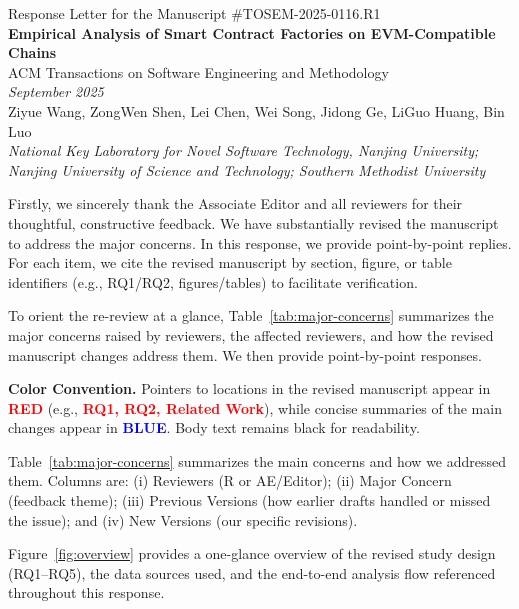 \documentclass[acmsmall]{acmart}
\begin{document}
	\pagestyle{plain}
	\begin{center}
		\Large Response Letter for the Manuscript \#TOSEM-2025-0116.R1 \\[1.5em] \LARGE\textbf{Empirical
		Analysis of Smart Contract Factories on EVM-Compatible Chains} \\[1.5em] \large ACM Transactions
		on Software Engineering and Methodology \\[1em] \normalsize \textit{September 2025}
		\\[1.5em] \normalsize Ziyue Wang, ZongWen Shen, Lei Chen, Wei Song, Jidong Ge, LiGuo Huang,
		Bin Luo \\[0.5em] \textit{National Key Laboratory for Novel Software Technology, Nanjing University;
		Nanjing University of Science and Technology; Southern Methodist University} \\[8em]
	\end{center}

	Firstly, we sincerely thank the Associate Editor and all reviewers for their thoughtful,
	constructive feedback. We have substantially revised the manuscript to address the major concerns.
	In this response, we provide point-by-point replies. For each item, we cite the revised manuscript
	by section, figure, or table identifiers (e.g., RQ1/RQ2, figures/tables) to facilitate
	verification.

	\vspace{0.5em}
	\noindent
	To orient the re-review at a glance, Table~\ref{tab:major-concerns} summarizes the major concerns
	raised by reviewers, the affected reviewers, and how the revised manuscript changes address them.
	We then provide point-by-point responses.

	\vspace{0.25em}
	\noindent
	\textbf{Color Convention.} Pointers to locations in the revised manuscript appear in \textcolor{red}{\textbf{RED}}
	(e.g., \textcolor{red}{\textbf{RQ1, RQ2, Related Work}}), while concise summaries of the main
	changes appear in \textcolor{blue}{\textbf{BLUE}}. Body text remains black for readability.

	\newpage

	
	Table~\ref{tab:major-concerns} summarizes the main concerns and how we addressed them. Columns
	are: (i) Reviewers (R or AE/Editor); (ii) Major Concern (feedback theme); (iii) Previous Versions
	(how earlier drafts handled or missed the issue); and (iv) New Versions (our specific revisions).

	\noindent
	Figure~\ref{fig:overview} provides a one-glance overview of the revised study design (RQ1--RQ5),
	the data sources used, and the end-to-end analysis flow referenced throughout this response.
\end{document}
